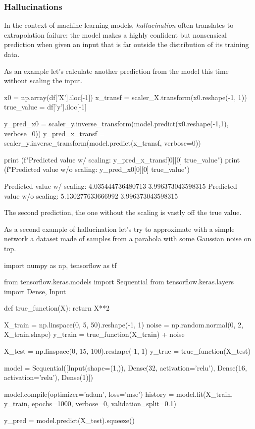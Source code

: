 \subsubsection{Hallucinations}

In the context of machine learning models, \textit{hallucination} often translates to extrapolation failure: the model makes a highly confident but nonsensical prediction when given an input that is far outside the distribution of its training data.

As an example let's calculate another prediction from the model this time without scaling the input.

\begin{ipythonnon}
x0 = np.array(df['X'].iloc[-1])
x_transf = scaler_X.transform(x0.reshape(-1, 1))
true_value = df['y'].iloc[-1]

y_pred_x0 = scaler_y.inverse_transform(model.predict(x0.reshape(-1,1), verbose=0))
y_pred_x_transf = scaler_y.inverse_transform(model.predict(x_transf, verbose=0))

print (f"Predicted value w/ scaling: {y_pred_x_transf[0][0]} {true_value}")
print (f"Predicted value w/o scaling: {y_pred_x0[0][0]} {true_value}")
\end{ipythonnon}
\begin{ioutput}
Predicted value w/ scaling: 4.035444736480713 3.996373043598315
Predicted value w/o scaling: 5.130277633666992 3.996373043598315
\end{ioutput}

The second prediction, the one without the scaling is vastly off the true value.

As a second example of hallucination let's try to approximate with a simple network a dataset made of samples from a parabola with some Gaussian noise on top.

\begin{ipythonnon}
import numpy as np, tensorflow as tf

from tensorflow.keras.models import Sequential
from tensorflow.keras.layers import Dense, Input

def true_function(X):
    return X**2

X_train = np.linspace(0, 5, 50).reshape(-1, 1)
noise = np.random.normal(0, 2, X_train.shape)
y_train = true_function(X_train) + noise

X_test = np.linspace(0, 15, 100).reshape(-1, 1)
y_true = true_function(X_test)

model = Sequential([Input(shape=(1,)),
                    Dense(32, activation='relu'),
                    Dense(16, activation='relu'),
                    Dense(1)])

model.compile(optimizer='adam', loss='mse')
history = model.fit(X_train, y_train, epochs=1000, verbose=0, validation_split=0.1)

y_pred = model.predict(X_test).squeeze()
\end{ipythonnon}

